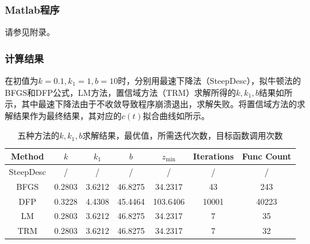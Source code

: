 \documentclass[12pt,a4paper]{article}
\begin{document}
\subsubsection{Matlab程序}

请参见附录。

\subsubsection{计算结果}

在初值为$k=0.1, k_1=1, b=10$时，分别用最速下降法（SteepDesc），拟牛顿法的BFGS和DFP公式，LM方法，置信域方法（TRM）求解所得的$k,k_1,b$结果如所示，其中最速下降法由于不收敛导致程序崩溃退出，求解失败。将置信域方法的求解结果作为最终结果，其对应的$c(t)$拟合曲线如所示。

\begin{table}
    \centering
    \caption{五种方法的$k,k_1,b$求解结果，最优值，所需迭代次数，目标函数调用次数}
    \label{tab:ex8_result}
    \begin{tabular}{c|ccc|ccc}
        \toprule
        Method & \(k\) & \(k_1\) & \(b\) & $z_{\min}$& Iterations &
        Func Count\tabularnewline
        \midrule
        SteepDesc & / & / & / & / & / & /\tabularnewline
        BFGS & 0.2803 & 3.6212 & 46.8275 & 34.2317 & 43 & 243\tabularnewline
        DFP & 0.3228 & 4.4308 & 45.4464 & 103.6406 & 10001 &
        40223\tabularnewline
        LM & 0.2803 & 3.6212 & 46.8275 & 34.2317 & 7 & 35\tabularnewline
        TRM & 0.2803 & 3.6212 & 46.8275 & 34.2317 & 7 & 32\tabularnewline
        \bottomrule
    \end{tabular}
\end{table}
\end{document}
